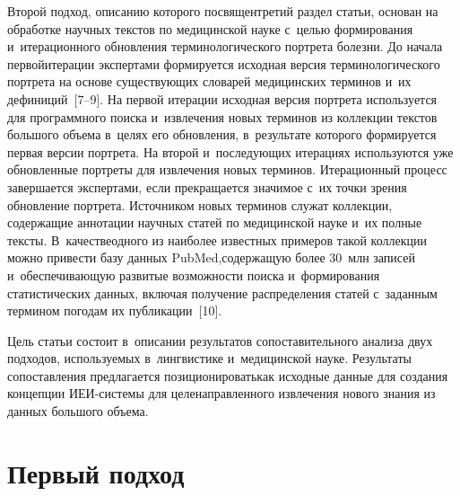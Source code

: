 \begin{multicols}{2}
  Второй подход, описанию которого посвящен\linebreak третий раздел статьи, 
основан на обработке научных текстов по медицинской науке с~целью 
формирования и~итерационного обновления терминологического портрета 
болезни. До начала первой\linebreak итерации экспертами формируется исходная 
версия терминологического портрета на основе существующих словарей 
медицинских терминов и~их дефиниций~[7--9]. На первой итерации исходная\linebreak 
версия портрета используется для программного поиска и~извлечения новых 
терминов из коллекции текстов большого объема в~целях его обновления,\linebreak 
в~результате которого формируется первая версии портрета. На второй 
и~последующих итерациях используются уже обновленные портреты для 
извлечения новых терминов. Итерационный процесс завершается 
экспертами, если прекращается значимое с~их точки зрения обновление 
портрета. Источником новых терминов служат коллекции,\linebreak 
содержащие 
аннотации научных статей по медицинской науке и~их полные тексты. 
В~качестве\linebreak одного из наиболее известных примеров такой коллекции можно 
привести базу данных PubMed,\linebreak содержащую более 30~млн записей 
и~обес\-пе\-чи\-ва\-ющую развитые возможности поиска и~формирования 
статистических данных, вклю\-чая получение распределения статей 
с~заданным термином по\linebreak годам их пуб\-ли\-ка\-ции~[10].
{ %

}
  
  Цель статьи состоит в~описании результатов сопоставительного анализа 
двух подходов, исполь\-зу\-емых в~лингвистике и~медицинской науке. 
Результаты сопоставления предлагается позиционировать\linebreak как исходные 
данные для создания концепции ИЕИ-сис\-те\-мы  
для целенаправленного 
извлечения нового знания из данных большого объема.
  

\section{Первый подход}

\vspace*{-17pt}


\end{multicols}
